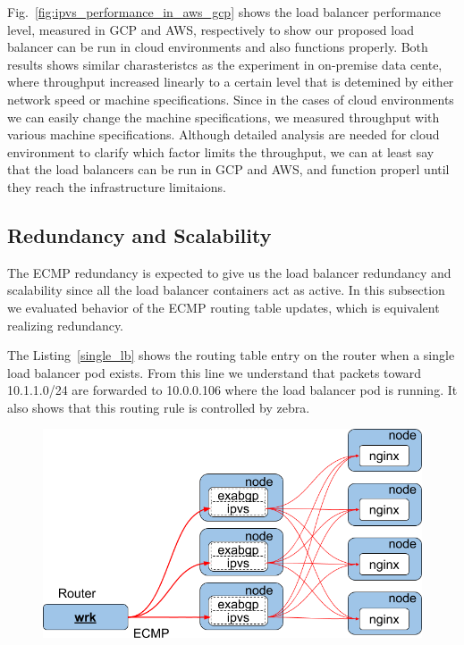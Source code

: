 Fig.~\ref{fig:ipvs_performance_in_aws_gcp} shows the load balancer performance level, measured in GCP and AWS, respectively to show our proposed load balancer can be run in cloud environments and also functions properly.
Both results shows similar charasteristcs as the experiment in on-premise data cente, where throughput increased linearly to a certain level that is detemined by either network speed or machine specifications.
Since in the cases of cloud environments we can easily change the machine specifications, we measured throughput with various machine specifications.
Although detailed analysis are needed for cloud environment to clarify which factor limits the throughput, we can at least say that
the load balancers can be run in GCP and AWS, and function properl until they reach the infrastructure limitaions.

\subsection{Redundancy and Scalability}

The ECMP redundancy is expected to give us the load balancer redundancy and scalability since all the load balancer containers act as active.
In this subsection we evaluated behavior of the ECMP routing table updates, which is equivalent realizing redundancy. 

The Listing~\ref{single_lb} shows the routing table entry on the router when a single load balancer pod exists.
From this line we understand that packets toward 10.1.1.0/24 are forwarded to 10.0.0.106 where the load balancer pod is running.
It also shows that this routing rule is controlled by zebra.

\begin{figure}[tb]
    \includegraphics[width=0.9\columnwidth]{Figs/lb_ecmp_schem}
    \caption{}
    \label{fig:lb_ecmp_schem}
\end{figure}

